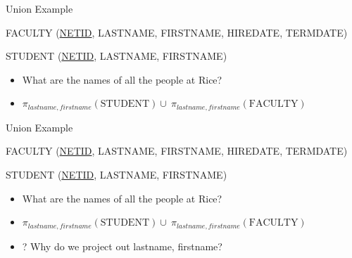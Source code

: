 \documentclass[aspectratio=169]{beamer}
\newenvironment{noindentitemize}
{ \begin{itemize}
 \setlength{\itemsep}{1.5ex}
  \setlength{\parsep}{0pt}   
  \setlength{\parskip}{0pt}
 \addtolength{\leftskip}{-2em}
 }
{ \end{itemize} }
\newcommand{\FACULTY}{\textrm{FACULTY}}
\newcommand{\STUDENT}{\textrm{STUDENT}}
\begin{document}
\begin{frame}{Union Example}

FACULTY (\underline{NETID}, LASTNAME, FIRSTNAME, HIREDATE, TERMDATE)

STUDENT (\underline{NETID}, LASTNAME, FIRSTNAME)

\begin{noindentitemize}
\item What are the names of all the people at Rice?
\item $\pi_{lastname, firstname}(\STUDENT) \cup\ \pi_{lastname, firstname}(\FACULTY)$
\end{noindentitemize}
\end{frame}

\begin{frame}{Union Example}

FACULTY (\underline{NETID}, LASTNAME, FIRSTNAME, HIREDATE, TERMDATE)

STUDENT (\underline{NETID}, LASTNAME, FIRSTNAME)

\begin{noindentitemize}
\item What are the names of all the people at Rice?
\item $\pi_{lastname, firstname}(\STUDENT) \cup\ \pi_{lastname, firstname}(\FACULTY)$
\item[?] Why do we project out lastname, firstname?
\end{noindentitemize}
\end{frame}

%
%
%
%
%
%
\end{document}
